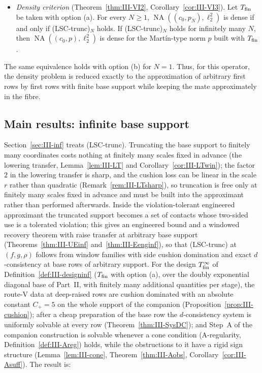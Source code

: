 \documentclass[10pt]{amsart}
\theoremstyle{definition}
\theoremstyle{remark}
\newcommand{\NA}{\operatorname{NA}}
\begin{document}
\begin{itemize}
\item[] \emph{Density criterion} (Theorem~\ref{thm:III-VI2},
Corollary~\ref{cor:III-VI3}).  Let $T_{\rm fin}$ be taken with option
\textup{(a)}.  For every $N\ge1$, $\NA((c_0,p_N),\ell_2^2)$ is dense if and
only if \textup{(LSC-trunc)$_N$} holds.  If \textup{(LSC-trunc)$_N$} holds
for infinitely many $N$, then $\NA((c_0,p),\ell_2^2)$ is dense for the
Mart\'in-type norm $p$ built with $T_{\rm fin}$.
\end{itemize}

The same equivalence holds with option (b) for $N=1$.  Thus, for this
operator, the density problem is reduced exactly to the approximation of
arbitrary first rows by first rows with finite base support while keeping
the mate approximately in the fibre.

\subsection{Main results: infinite base support}
Section~\ref{sec:III-inf} treats (LSC-trunc).  Truncating the base support
to finitely many coordinates costs nothing at finitely many scales fixed in
advance (the lowering transfer, Lemma~\ref{lem:III-LT} and
Corollary~\ref{cor:III-LTwin}); the factor $2$ in the lowering transfer is
sharp, and the cushion loss can be linear in the scale $r$ rather than
quadratic (Remark~\ref{rem:III-LTsharp}), so truncation is free only at
finitely many scales fixed in advance and must be built into the
approximant rather than performed afterwards.  Inside the violation-tolerant
engineered approximant the truncated support becomes a set of contacts whose
two-sided use is a tolerated violation; this gives an engineered bound and a
windowed recovery theorem with raise transfer at arbitrary base support
(Theorems~\ref{thm:III-UEinf} and~\ref{thm:III-Eenginf}), so that
(LSC-trunc) at $(f,g,\rho)$ follows from window families with side cushion
domination and exact $d$-consistency at base rows of arbitrary support.
For the design $T^\infty_{\rm fin}$ of Definition~\ref{def:III-designinf}
($T_{\rm fin}$ with option (a), over the doubly exponential diagonal base of
Part~II, with finitely many additional quantities per stage), the route-V
data at deep-raised rows are cushion dominated with an absolute constant
$C_+=5$ on the whole support of the companion
(Proposition~\ref{prop:III-cushion}); after a cheap preparation of the base
row the $d$-consistency system is uniformly solvable at every row
(Theorem~\ref{thm:III-SysDC}); and Step~A of the companion construction is
solvable whenever a cone condition (A-regularity,
Definition~\ref{def:III-Areg}) holds, while the obstructions to it have a
rigid sign structure (Lemma~\ref{lem:III-cone}, Theorem~\ref{thm:III-Aobs},
Corollary~\ref{cor:III-Asuff}).  The result is:
\end{document}
